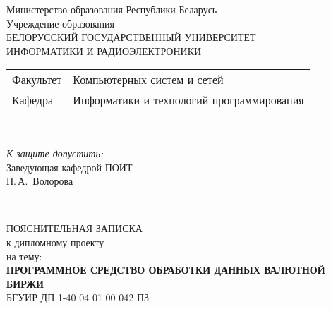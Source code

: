 \begin{titlepage}
  \begin{center}
    Министерство образования Республики Беларусь\\[1em]
    Учреждение образования\\
    БЕЛОРУССКИЙ ГОСУДАРСТВЕННЫЙ УНИВЕРСИТЕТ \\
    ИНФОРМАТИКИ И РАДИОЭЛЕКТРОНИКИ\\[1em]

    \begin{minipage}{\textwidth}
      \begin{flushleft}
        \begin{tabular}{ l l }
          Факультет & Компьютерных систем и сетей\\
          Кафедра   & Информатики и технологий программирования
        \end{tabular}
      \end{flushleft}
    \end{minipage}\\[1em]

    \begin{flushright}
      \begin{minipage}{0.4\textwidth}
        \textit{К защите допустить:}\\[0.8em]
        Заведующая кафедрой ПОИТ\\[0.45em]
        \underline{\hspace*{2.8cm}} Н.\,А.~Волорова
      \end{minipage}\\[2.2em]
    \end{flushright}

    {ПОЯСНИТЕЛЬНАЯ ЗАПИСКА}\\
    {к дипломному проекту}\\
    {на тему:}\\[1em]
    \textbf{\large \MakeUppercase{Программное средство обработки данных валютной биржи}}\\[1em]


    {БГУИР ДП 1-40 04 01 00 042 ПЗ}\\[2em]
    

\end{center}
\end{titlepage}
